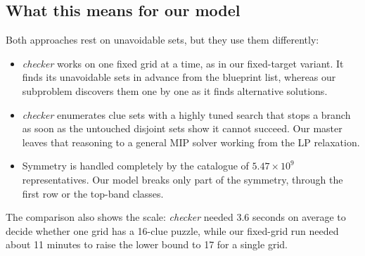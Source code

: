 \documentclass[11pt]{article}
\begin{document}
\subsection*{What this means for our model}

Both approaches rest on unavoidable sets, but they use them differently:
\begin{itemize}
    \item \emph{checker} works on one fixed grid at a time, as in our fixed-target variant. It finds its unavoidable sets in advance from the blueprint list, whereas our subproblem discovers them one by one as it finds alternative solutions.
    \item \emph{checker} enumerates clue sets with a highly tuned search that stops a branch as soon as the untouched disjoint sets show it cannot succeed. Our master leaves that reasoning to a general MIP solver working from the LP relaxation.
    \item Symmetry is handled completely by the catalogue of $5.47\times10^9$ representatives. Our model breaks only part of the symmetry, through the first row or the top-band classes.
\end{itemize}
The comparison also shows the scale: \emph{checker} needed 3.6 seconds on average to decide whether one grid has a 16-clue puzzle, while our fixed-grid run needed about 11 minutes to raise the lower bound to 17 for a single grid.
\end{document}
